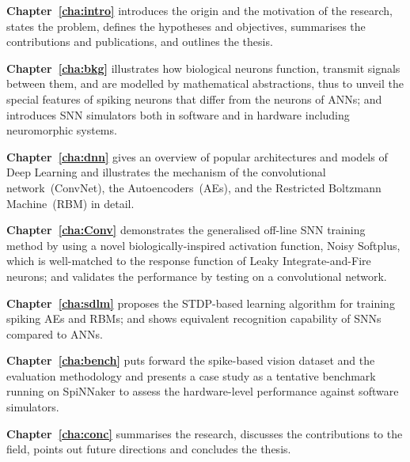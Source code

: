 \textbf{Chapter~\ref{cha:intro}} introduces the origin and the motivation of the research, states the problem, defines the hypotheses and objectives, summarises the contributions and publications, and outlines the thesis. 

\textbf{Chapter~\ref{cha:bkg}} %
illustrates how biological neurons function, transmit signals between them, and are modelled by mathematical abstractions, thus to unveil the special features of spiking neurons that differ from the neurons of ANNs; and introduces SNN simulators both in software and in hardware including neuromorphic systems.

\textbf{Chapter~\ref{cha:dnn}} gives an overview of popular architectures and models of Deep Learning and illustrates the mechanism of the convolutional network~(ConvNet), the Autoencoders~(AEs), and the Restricted Boltzmann Machine~(RBM) in detail.

\textbf{Chapter~\ref{cha:Conv}} demonstrates the generalised off-line SNN training method by using a novel biologically-inspired activation function, Noisy Softplus, which is well-matched to the response function of Leaky Integrate-and-Fire neurons; and validates the performance by testing on a convolutional network.

\textbf{Chapter~\ref{cha:sdlm}} proposes the STDP-based learning algorithm for training spiking AEs and RBMs; and shows equivalent recognition capability of SNNs compared to ANNs.

\textbf{Chapter~\ref{cha:bench}} puts forward the spike-based vision dataset and the evaluation methodology and presents a case study as a tentative benchmark running on SpiNNaker to assess the hardware-level performance against software simulators.

\textbf{Chapter~\ref{cha:conc}} summarises the research, discusses the contributions to the field, points out future directions and concludes the thesis.

